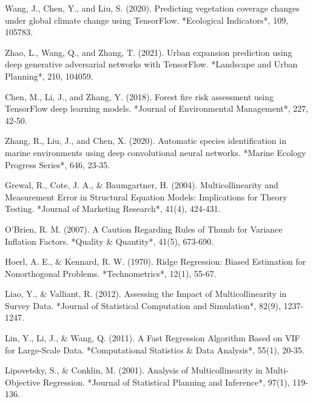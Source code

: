 \documentclass{article}
\begin{document}
\begin{thebibliography}{99}
Wang, J., Chen, Y., and Liu, S. (2020). Predicting vegetation coverage changes under global climate change using TensorFlow. *Ecological Indicators*, 109, 105783.

Zhao, L., Wang, Q., and Zhang, T. (2021). Urban expansion prediction using deep generative adversarial networks with TensorFlow. *Landscape and Urban Planning*, 210, 104059.

Chen, M., Li, J., and Zhang, Y. (2018). Forest fire risk assessment using TensorFlow deep learning models. *Journal of Environmental Management*, 227, 42-50.

Zhang, R., Liu, J., and Chen, X. (2020). Automatic species identification in marine environments using deep convolutional neural networks. *Marine Ecology Progress Series*, 646, 23-35.

Grewal, R., Cote, J. A., \& Baumgartner, H. (2004). Multicollinearity and Measurement Error in Structural Equation Models: Implications for Theory Testing. *Journal of Marketing Research*, 41(4), 424-431.

O'Brien, R. M. (2007). A Caution Regarding Rules of Thumb for Variance Inflation Factors. *Quality \& Quantity*, 41(5), 673-690.

Hoerl, A. E., \& Kennard, R. W. (1970). Ridge Regression: Biased Estimation for Nonorthogonal Problems. *Technometrics*, 12(1), 55-67.

Liao, Y., \& Valliant, R. (2012). Assessing the Impact of Multicollinearity in Survey Data. *Journal of Statistical Computation and Simulation*, 82(9), 1237-1247.

Lin, Y., Li, J., \& Wang, Q. (2011). A Fast Regression Algorithm Based on VIF for Large-Scale Data. *Computational Statistics \& Data Analysis*, 55(1), 20-35.

Lipovetsky, S., \& Conklin, M. (2001). Analysis of Multicollinearity in Multi-Objective Regression. *Journal of Statistical Planning and Inference*, 97(1), 119-136.


\end{thebibliography}
\end{document}
